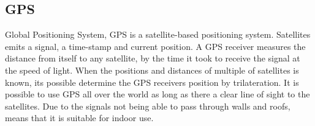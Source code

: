 
\subsection{GPS}

Global Positioning System, GPS is a satellite-based positioning system. Satellites emits a signal, a time-stamp and current position. A GPS receiver measures the distance from itself to any satellite, by the time it took to receive the signal at the speed of light. When the positions and distances of multiple of satellites is known, its possible determine the GPS receivers position by trilateration\cite{Dempster2013}. It is possible to use GPS all over the world as long as there a clear line of sight to the satellites. Due to the signals not being able to pass through walls and roofs, means that it is suitable for indoor use\cite{GPS_about}.